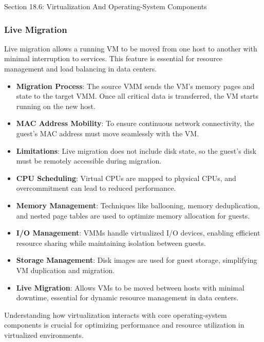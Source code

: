 \begin{notes}{Section 18.6: Virtualization And Operating-System Components}
\begin{highlight}
    \end{highlight}
    
    \subsubsection*{Live Migration}
    
    Live migration allows a running VM to be moved from one host to another with minimal interruption to services. This feature is essential for resource management and load balancing in data centers.
    
    \begin{highlight}
    
        \begin{itemize}
            \item \textbf{Migration Process}: The source VMM sends the VM's memory pages and state to the target VMM. Once all critical data is transferred, the VM starts running on the new host.
            \item \textbf{MAC Address Mobility}: To ensure continuous network connectivity, the guest's MAC address must move seamlessly with the VM.
            \item \textbf{Limitations}: Live migration does not include disk state, so the guest's disk must be remotely accessible during migration.
        \end{itemize}
    
    \end{highlight}
    
    \begin{highlight}
    
        \begin{itemize}
            \item \textbf{CPU Scheduling}: Virtual CPUs are mapped to physical CPUs, and overcommitment can lead to reduced performance.
            \item \textbf{Memory Management}: Techniques like ballooning, memory deduplication, and nested page tables are used to optimize memory allocation for guests.
            \item \textbf{I/O Management}: VMMs handle virtualized I/O devices, enabling efficient resource sharing while maintaining isolation between guests.
            \item \textbf{Storage Management}: Disk images are used for guest storage, simplifying VM duplication and migration.
            \item \textbf{Live Migration}: Allows VMs to be moved between hosts with minimal downtime, essential for dynamic resource management in data centers.
        \end{itemize}
    
    Understanding how virtualization interacts with core operating-system components is crucial for optimizing performance and resource utilization in virtualized environments.
    
    \end{highlight}
\end{notes}

